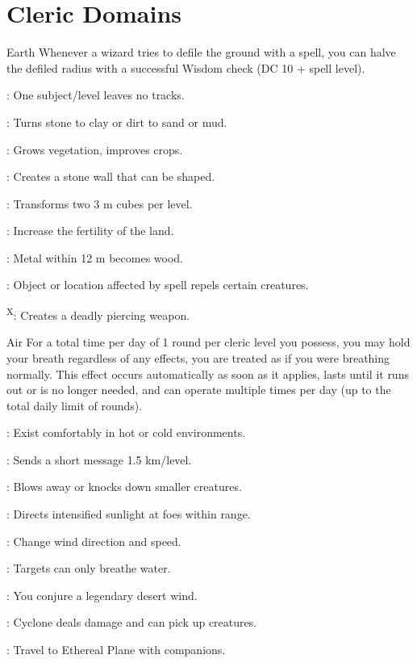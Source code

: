 \section{Cleric Domains}

{Earth}
{Whenever a wizard tries to defile the ground with a spell, you can halve the defiled radius with a successful Wisdom check (DC 10 + spell level).}
{
	\item {}: One subject/level leaves no tracks.
	\item {}: Turns stone to clay or dirt to sand or mud.
	\item {}: Grows vegetation, improves crops.
	\item {}: Creates a stone wall that can be shaped.
	\item {}: Transforms two 3 m cubes per level.
	\item {}: Increase the fertility of the land.
	\item {}: Metal within 12 m becomes wood.
	\item {}: Object or location affected by spell repels certain creatures.
	\item {}\textsuperscript{X}: Creates a deadly piercing weapon.
}

{Air}
{For a total time per day of 1 round per cleric level you possess, you may hold your breath regardless of any effects, you are treated as if you were breathing normally. This effect occurs automatically as soon as it applies, lasts until it runs out or is no longer needed, and can operate multiple times per day (up to the total daily limit of rounds).}
{
	\item {}: Exist comfortably in hot or cold environments.
	\item {}: Sends a short message 1.5 km/level.
	\item {}: Blows away or knocks down smaller creatures.
	\item {}: Directs intensified sunlight at foes within range.
	\item {}: Change wind direction and speed.
	\item {}: Targets can only breathe water.
	\item {}: You conjure a legendary desert wind.
	\item {}: Cyclone deals damage and can pick up creatures.
	\item {}: Travel to Ethereal Plane with companions.
}


